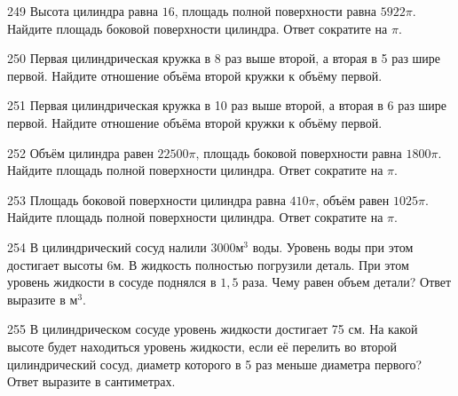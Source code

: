 \documentclass[4apaper]{article}
\begin{document}
\begin{taskBN}{249}
Высота цилиндра равна $16$, площадь полной поверхности равна $5922\pi$. Найдите площадь боковой поверхности цилиндра. Ответ сократите на $\pi$.
\end{taskBN}

\begin{taskBN}{250}
 Первая цилиндрическая кружка в 8 раз выше второй, а вторая в 5 раз шире первой. Найдите отношение объёма второй кружки к объёму первой.
\end{taskBN}

\begin{taskBN}{251}
 Первая цилиндрическая кружка в 10 раз выше второй, а вторая в 6 раз шире первой. Найдите отношение объёма второй кружки к объёму первой.
\end{taskBN}

\begin{taskBN}{252}
Объём цилиндра равен $22500\pi$, площадь боковой поверхности равна $1800\pi$. Найдите площадь полной поверхности цилиндра. Ответ сократите на $\pi$.
\end{taskBN}

\begin{taskBN}{253}
Площадь боковой поверхности цилиндра равна $410\pi$, объём равен $1025\pi$. Найдите площадь полной поверхности цилиндра. Ответ сократите на $\pi$.
\end{taskBN}

\begin{taskBN}{254}
В цилиндрический сосуд налили $3000\mbox{м}^3$ воды. Уровень воды при этом достигает высоты $6$м. В жидкость полностью погрузили деталь. При этом уровень жидкости в сосуде поднялся в $ 1{,}5 $ раза. Чему равен объем детали? Ответ выразите в $\mbox{м}^3$.
\end{taskBN}

\begin{taskBN}{255}
В цилиндрическом сосуде уровень жидкости достигает 75 см. На какой высоте будет находиться уровень жидкости, если её перелить во второй цилиндрический сосуд, диаметр которого в 5 раз меньше диаметра первого? Ответ выразите в сантиметрах.
\end{taskBN}
\end{document}
